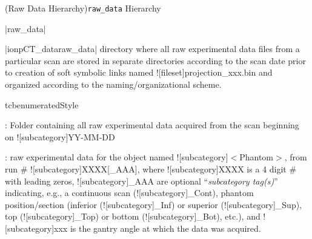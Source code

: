 \Subsection(Raw Data Hierarchy){\texttt{raw\_data} Hierarchy}
\begin{tcbenvironment}|raw\_data|
\begin{tcbparbox}|\dirsep ion\dirsep pCT\_data\dirsep raw\_data|%
\bfdash directory where all raw experimental data files from a particular scan are stored in separate directories according to the scan date prior to creation of soft symbolic links named \docentry![fileset]{projection\_xxx.bin} and organized according to the naming/organizational scheme.
\end{tcbparbox}
\begin{tcbparbox}{tcbenumeratedStyle}
\begin{ThinEnum}[labelindent=1pt, leftmargin=*]
    \item {} : Folder containing all raw experimental data acquired from the scan beginning on \docentry![subcategory]{YY-MM-DD}
    \begin{ThinEnum}[labelindent=1pt, leftmargin=*]
        \item {} : raw experimental data for the object named \docentry![subcategory]{$<$Phantom$>$}, from run \# \docentry![subcategory]{XXXX[\_AAA]}, where \docentry![subcategory]{XXXX} is a 4 digit \# with leading zeros, \docentry![subcategory]{\_AAA} are optional ``\emph{subcategory tag(s)}'' indicating, e.g., a continuous scan (\docentry![subcategory]{\_Cont}), phantom position/section (inferior (\docentry![subcategory]{\_Inf}) or superior (\docentry![subcategory]{\_Sup}), top (\docentry![subcategory]{\_Top}) or bottom (\docentry![subcategory]{\_Bot}), etc.), and \docentry![subcategory]{xxx} is the gantry angle at which the data was acquired.
    \end{ThinEnum}
\end{ThinEnum}
\end{tcbparbox}
\end{tcbenvironment}
\endinput
